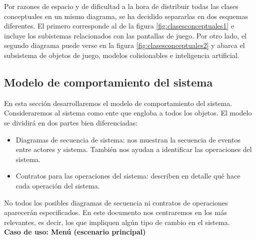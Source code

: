 
Por razones de espacio y de dificultad a la hora de distribuir todas las
clases conceptuales en un mismo diagrama, se ha decidido separarlas en
dos esquemas diferentes. El primero corresponde al de la figura \ref{fig:clasesconceptuales1}
e incluye los subistemas relacionados con las pantallas de juego. Por otro
lado, el segundo diagrama puede verse en la figura \ref{fig:clasesconceptuales2}
y abarca el subsistema de objetos de juego, modelos colisionables e inteligencia
artificial.\\



\subsection{Modelo de comportamiento del sistema}

En esta sección desarrollaremos el modelo de comportamiento del sistema.
Consideraremos al sistema como ente que engloba a todos los objetos. El modelo
se dividirá en dos partes bien diferenciadas:

\begin{itemize}
    \item Diagramas de secuencia de sistema: nos muestran la secuencia de
    eventos entre actores y sistema. También nos ayudan a identificar las
    operaciones del sistema.
    \item Contratos para las operaciones del sistema: describen en detalle
    qué hace cada operación del sistema.
\end{itemize}

No todos los posibles diagramas de secuencia ni contratos de operaciones
aparecerán especificados. En este documento nos centraremos en los más relevantes,
es decir, los que impliquen algún tipo de cambio en el sistema.\\


\textbf{Caso de uso: Menú (escenario principal)}


